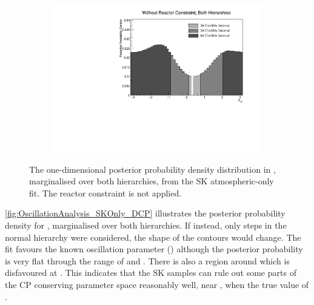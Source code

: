 \begin{figure}[h]
  \begin{subfigure}[t]{0.98\textwidth}
    \includegraphics[width=\textwidth, trim={0mm 0mm 0mm 0mm}, clip,page=1]{Figures/OA/SKOnlyFit/Contours_1D_dcp_BH_1_woRC_UnSmeared_CredibleInterval.pdf}
  \end{subfigure}
  \caption{The one-dimensional posterior probability density distribution in , marginalised over both hierarchies, from the SK atmospheric-only fit. The reactor constraint is not applied.}
  \label{fig:OscillationAnalysis_SKOnly_DCP}
\end{figure}

\autoref{fig:OscillationAnalysis_SKOnly_DCP} illustrates the posterior probability density for , marginalised over both hierarchies. If instead, only steps in the normal hierarchy were considered, the shape of the contours would change. The fit favours the known oscillation parameter () although the posterior probability is very flat through the range of  and . There is also a region around  which is disfavoured at \quickmath{2\sigma}. This indicates that the SK samples can rule out some parts of the CP conserving parameter space reasonably well, near , when the true value of .

